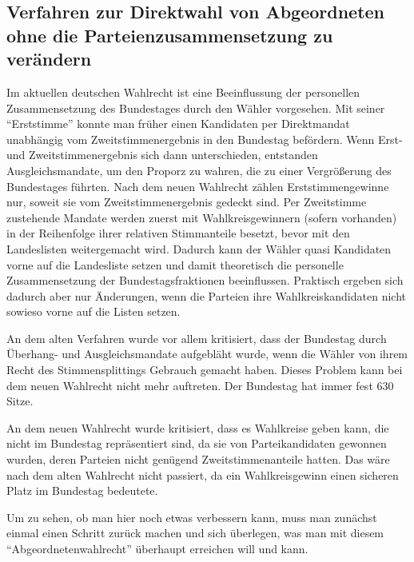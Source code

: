 \subsection{Verfahren zur Direktwahl von Abgeordneten ohne die Parteienzusammensetzung zu
  verändern}

Im aktuellen deutschen Wahlrecht ist eine Beeinflussung der personellen Zusammensetzung des
Bundestages durch den Wähler vorgesehen. Mit seiner \enquote{Erststimme} konnte man früher einen
Kandidaten per Direktmandat unabhängig vom Zweitstimmenergebnis in den Bundestag befördern. Wenn
Erst- und Zweitstimmenergebnis sich dann unterschieden, entstanden Ausgleichsmandate, um den
Proporz zu wahren, die zu einer Vergrößerung des Bundestages führten. Nach dem neuen Wahlrecht
zählen Erststimmengewinne nur, soweit sie vom Zweitstimmenergebnis gedeckt sind. Per Zweitstimme
zustehende Mandate werden zuerst mit Wahlkreisgewinnern (sofern vorhanden) in der Reihenfolge
ihrer relativen Stimmanteile besetzt, bevor mit den Landeslisten weitergemacht wird. Dadurch kann
der Wähler quasi Kandidaten vorne auf die Landesliste setzen und damit theoretisch die personelle
Zusammensetzung der Bundestagsfraktionen beeinflussen. Praktisch ergeben sich dadurch aber nur
Änderungen, wenn die Parteien ihre Wahlkreiskandidaten nicht sowieso vorne auf die Listen setzen.

An dem alten Verfahren wurde vor allem kritisiert, dass der Bundestag durch Überhang- und
Ausgleichsmandate aufgebläht wurde, wenn die Wähler von ihrem Recht des Stimmensplittings
Gebrauch gemacht haben. Dieses Problem kann bei dem neuen Wahlrecht nicht mehr auftreten. Der
Bundestag hat immer fest 630 Sitze.

An dem neuen Wahlrecht wurde kritisiert, dass es Wahlkreise geben kann, die nicht im Bundestag
repräsentiert sind, da sie von Parteikandidaten gewonnen wurden, deren Parteien nicht genügend
Zweitstimmenanteile hatten. Das wäre nach dem alten Wahlrecht nicht passiert, da ein
Wahlkreisgewinn einen sicheren Platz im Bundestag bedeutete.

Um zu sehen, ob man hier noch etwas verbessern kann, muss man zunächst einmal einen Schritt
zurück machen und sich überlegen, was man mit diesem \enquote{Abgeordnetenwahlrecht} überhaupt
erreichen will und kann.

